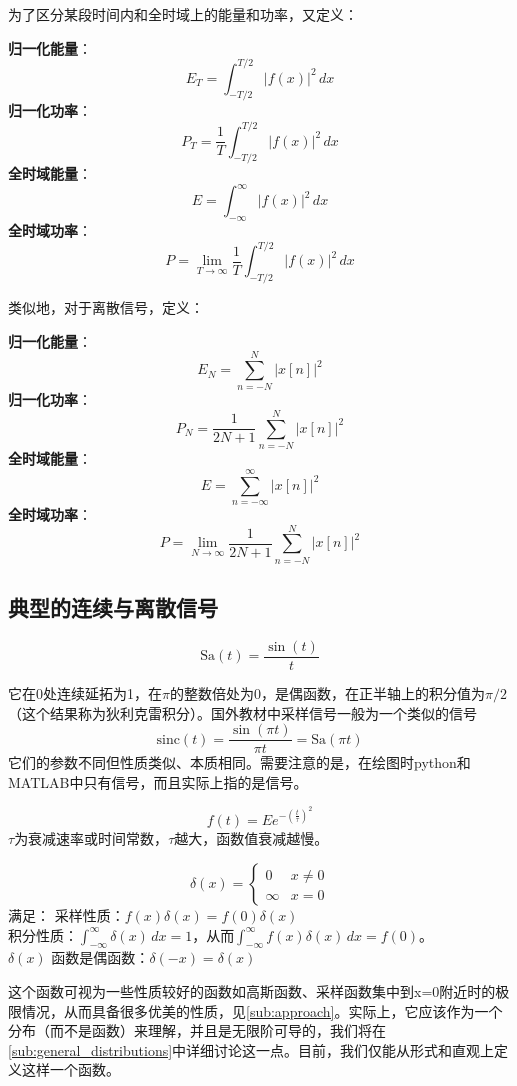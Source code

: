\documentclass{ctexbook}
\begin{document}
为了区分某段时间内和全时域上的能量和功率，又定义：\begin{definition}
\quad\newline
    \textbf{归一化能量}：$$E_T=\int_{-T/2}^{T/2}| f(x)| ^2\,dx$$
    \textbf{归一化功率}：$$P_T=\dfrac{1}{T}\int_{-T/2}^{T/2}| f(x)| ^2\,dx$$
\textbf{全时域能量}：$$E=\int_{-\infty}^{\infty}| f(x)| ^2\,dx$$
\textbf{全时域功率}：$$P=\lim_{T \to \infty}  \dfrac{1}{T}\int_{-T/2}^{T/2}| f(x)| ^2\,dx$$
\end{definition}

类似地，对于离散信号，定义：
\begin{definition}
    \quad\newline
    \textbf{归一化能量}：$$E_N=\sum_{n = -N}^{N}  |x[n]| ^2$$
    \textbf{归一化功率}：$$P_N=\dfrac{1}{2N+1}\sum_{n = -N}^{N}  |x[n]| ^2$$
\textbf{全时域能量}：$$E=\sum_{n = -\infty}^{\infty}  |x[n]| ^2$$
\textbf{全时域功率}：$$P=\lim_{N \to \infty}  \dfrac{1}{2N+1}\sum_{n = -N}^{N}  |x[n]| ^2$$
\end{definition}

\subsection{典型的连续与离散信号}\label{sub:ordinary_signal}
\begin{definition}[采样信号]
    \[\text{Sa}(t)=\frac{\sin(t)}{t}\]
\end{definition}
它在0处连续延拓为1，在$\pi$的整数倍处为0，是偶函数，在正半轴上的积分值为$\pi /2$（这个结果称为狄利克雷积分）。国外教材中采样信号一般为一个类似的信号
\[\text{sinc}(t)=\frac{\sin(\pi t)}{\pi t}=\text{Sa}(\pi t)\]
它们的参数不同但性质类似、本质相同。需要注意的是，在绘图时python和MATLAB中只有信号，而且实际上指的是信号。
\begin{definition}
    \[f(t)=Ee^{-{\left(\frac{t}{\tau }\right)}^2}\]
    $\tau$为衰减速率或时间常数，$\tau$越大，函数值衰减越慢。
\end{definition}
\begin{definition}
    $$\delta (x)=\begin{cases}
        0      & x\neq 0 \\
        \infty & x=0
    \end{cases}$$满足： 采样性质：$f(x)\delta (x)=f(0)\delta (x)$\\
 积分性质：$\int_{-\infty}^{\infty}\delta (x)\,dx=1$，从而$\int_{-\infty}^{\infty}f(x)\delta (x)\,dx=f(0)$。\\
 $\delta(x)$ 函数是偶函数：$\delta (-x)=\delta (x)$
\end{definition}
这个函数可视为一些性质较好的函数如高斯函数、采样函数集中到x=0附近时的极限情况，从而具备很多优美的性质，见\ref{sub:approach}。实际上，它应该作为一个分布（而不是函数）来理解，并且是无限阶可导的，我们将在\ref{sub:general_distributions}中详细讨论这一点。目前，我们仅能从形式和直观上定义这样一个函数。
\end{document}
